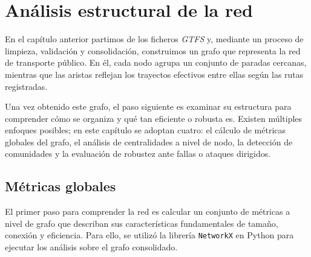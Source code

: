 \chapter{Análisis estructural de la red}

    En el capítulo anterior partimos de los ficheros \textit{GTFS} y, mediante un proceso de limpieza, validación y consolidación, construimos un grafo que representa la red de transporte público. En él, cada nodo agrupa un conjunto de paradas cercanas, mientras que las aristas reflejan los trayectos efectivos entre ellas según las rutas registradas.

    Una vez obtenido este grafo, el paso siguiente es examinar su estructura para comprender cómo se organiza y qué tan eficiente o robusta es. Existen múltiples enfoques posibles; en este capítulo se adoptan cuatro: el cálculo de métricas globales del grafo, el análisis de centralidades a nivel de nodo, la detección de comunidades y la evaluación de robustez ante fallas o ataques dirigidos.

    
\section{Métricas globales}

    El primer paso para comprender la red es calcular un conjunto de métricas a nivel de grafo que describan sus características fundamentales de tamaño, conexión y eficiencia. Para ello, se utilizó la librería \texttt{NetworkX} en Python para ejecutar los análisis sobre el grafo consolidado.

